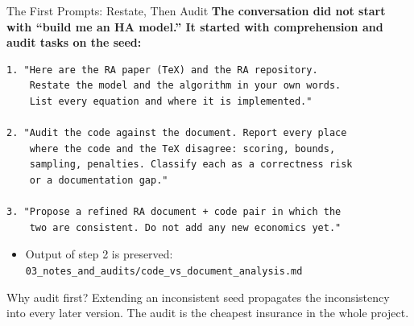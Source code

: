 \documentclass[10pt,aspectratio=169]{beamer}
\begin{document}
\begin{frame}[fragile]{The First Prompts: Restate, Then Audit}
\textbf{The conversation did not start with ``build me an HA model.'' It started with comprehension and audit tasks on the seed:}

\begin{lstlisting}[basicstyle=\ttfamily\scriptsize,numbers=none]
1. "Here are the RA paper (TeX) and the RA repository.
    Restate the model and the algorithm in your own words.
    List every equation and where it is implemented."

2. "Audit the code against the document. Report every place
    where the code and the TeX disagree: scoring, bounds,
    sampling, penalties. Classify each as a correctness risk
    or a documentation gap."

3. "Propose a refined RA document + code pair in which the
    two are consistent. Do not add any new economics yet."
\end{lstlisting}

\smallskip
\begin{itemize}\small
    \item Output of step 2 is preserved: \texttt{03\_notes\_and\_audits/code\_vs\_document\_analysis.md}
\end{itemize}
\begin{block}{Why audit first?}
\small Extending an inconsistent seed propagates the inconsistency
into every later version. The audit is the cheapest insurance in the whole project.
\end{block}
\end{frame}
\end{document}
